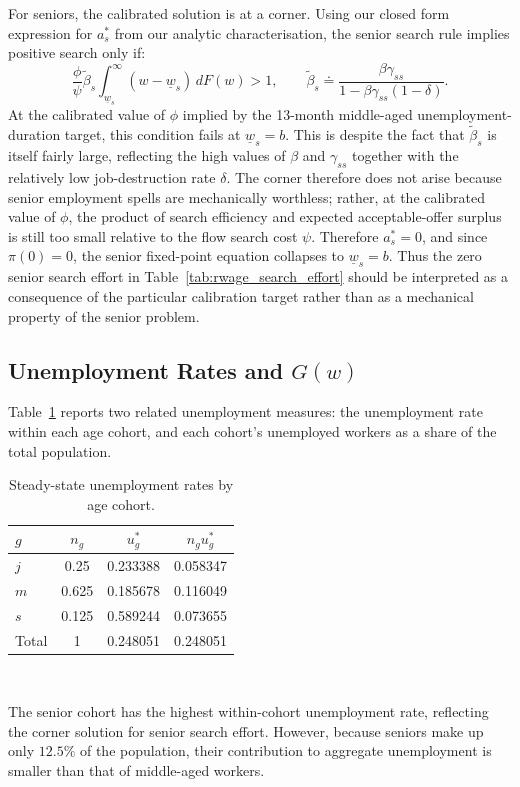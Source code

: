 \documentclass{article}
\newcommand{\lbar}[1]{\underline{#1}} %
\begin{document}
For seniors, the calibrated solution is at a corner. Using our closed form expression for $a^*_s$ from our analytic characterisation, the senior search rule implies positive search only if:
\[
\frac{\phi}{\psi}\tilde\beta_s\int_{\lbar w_s}^{\infty}
(w-\lbar w_s)\,dF(w)>1,
\qquad
\tilde\beta_s
\doteq
\frac{\beta\gamma_{ss}}
{1-\beta\gamma_{ss}(1-\delta)}.
\]
At the calibrated value of $\phi$ implied by the 13-month middle-aged unemployment-duration target, this condition fails at $\underline w_s=b$. This is despite the fact that $\tilde\beta_s$ is itself fairly large, reflecting the high values of $\beta$ and $\gamma_{ss}$ together with the relatively low job-destruction rate $\delta$. The corner therefore does not arise because senior employment spells are mechanically worthless; rather, at the calibrated value of $\phi$, the product of search efficiency and expected acceptable-offer surplus is still too small relative to the flow search cost $\psi$. Therefore $a_s^*=0$, and since $\pi(0)=0$, the senior fixed-point equation collapses to $\underline w_s=b$. Thus the zero senior search effort in Table~\ref{tab:rwage_search_effort} should be interpreted as a consequence of the particular calibration target rather than as a mechanical property of the senior problem.

\subsection{\texorpdfstring{Unemployment Rates and $G(w)$}{Unemployment Rates and G(w)}}
Table~\ref{tab:unemployment_by_age} reports two related unemployment measures: the unemployment rate within each age cohort, and each cohort's unemployed workers as a share of the total population.
\begin{table}[!ht]
\centering
\begin{tabular}{lccc}
\hline
$g$ & $n_g$ & $u^*_g$ & $n_g u^*_g$ \\
\hline
$j$ & 0.25 & 0.233388 & 0.058347 \\
$m$ & 0.625 & 0.185678 & 0.116049 \\
$s$ & 0.125 & 0.589244 & 0.073655 \\
\hline
Total & 1 & 0.248051 & 0.248051 \\
\hline
\end{tabular}
\caption{Steady-state unemployment rates by age cohort.}
~\label{tab:unemployment_by_age}
\end{table}
The senior cohort has the highest within-cohort unemployment rate, reflecting the corner solution for senior search effort. However, because seniors make up only $12.5\%$ of the population, their contribution to aggregate unemployment is smaller than that of middle-aged workers.
\end{document}
